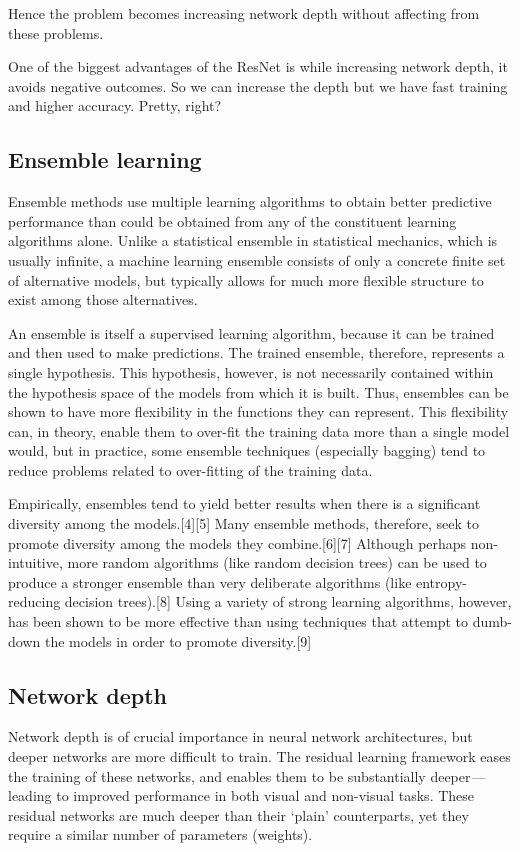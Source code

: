 \documentclass[12pt]{article}
\numberwithin{equation}{section}
\numberwithin{table}{section}
\numberwithin{figure}{section}
\begin{document}
Hence the problem becomes increasing network depth without affecting from these problems.

One of the biggest advantages of the ResNet is while increasing network depth, it avoids negative outcomes. So we can increase the depth but we have fast training and higher accuracy. Pretty, right?


\subsection{Ensemble learning}
Ensemble methods use multiple learning algorithms to obtain better predictive performance than could be obtained from any of the constituent learning algorithms alone. Unlike a statistical ensemble in statistical mechanics, which is usually infinite, a machine learning ensemble consists of only a concrete finite set of alternative models, but typically allows for much more flexible structure to exist among those alternatives.

An ensemble is itself a supervised learning algorithm, because it can be trained and then used to make predictions. The trained ensemble, therefore, represents a single hypothesis. This hypothesis, however, is not necessarily contained within the hypothesis space of the models from which it is built. Thus, ensembles can be shown to have more flexibility in the functions they can represent. This flexibility can, in theory, enable them to over-fit the training data more than a single model would, but in practice, some ensemble techniques (especially bagging) tend to reduce problems related to over-fitting of the training data.

Empirically, ensembles tend to yield better results when there is a significant diversity among the models.[4][5] Many ensemble methods, therefore, seek to promote diversity among the models they combine.[6][7] Although perhaps non-intuitive, more random algorithms (like random decision trees) can be used to produce a stronger ensemble than very deliberate algorithms (like entropy-reducing decision trees).[8] Using a variety of strong learning algorithms, however, has been shown to be more effective than using techniques that attempt to dumb-down the models in order to promote diversity.[9]

\subsection{Network depth}

Network depth is of crucial importance in neural network architectures, but deeper networks are more difficult to train. The residual learning framework eases the training of these networks, and enables them to be substantially deeper — leading to improved performance in both visual and non-visual tasks. These residual networks are much deeper than their ‘plain’ counterparts, yet they require a similar number of parameters (weights).
\end{document}
